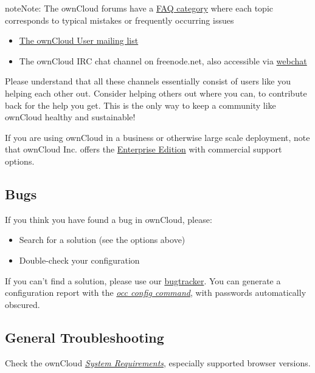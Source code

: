 \documentclass[letterpaper,10pt,english]{sphinxmanual}
\begin{document}
\begin{notice}{note}{Note:}
The ownCloud forums have a \href{https://central.owncloud.org/c/faq}{FAQ category} where each topic corresponds
to typical mistakes or frequently occurring issues
\end{notice}
\begin{itemize}
\item {} 
\href{https://mailman.owncloud.org/mailman/listinfo/user}{The ownCloud User mailing list}

\item {} 
The ownCloud IRC chat channel  on
freenode.net, also accessible via \href{http://webchat.freenode.net/?channels=owncloud}{webchat}

\end{itemize}

Please understand that all these channels essentially consist of users like you
helping each other out. Consider helping others out where you can, to contribute
back for the help you get. This is the only way to keep a community like
ownCloud healthy and sustainable!

If you are using ownCloud in a business or otherwise large scale deployment,
note that ownCloud Inc. offers the \href{https://owncloud.com/lp/community-or-enterprise/}{Enterprise Edition} with commercial
support options.


\subsection{Bugs}
\label{issues/general_troubleshooting:bugs}
If you think you have found a bug in ownCloud, please:
\begin{itemize}
\item {} 
Search for a solution (see the options above)

\item {} 
Double-check your configuration

\end{itemize}

If you can't find a solution, please use our \href{https://doc.owncloud.org/server/9.2/developer\_manual/bugtracker/index.html}{bugtracker}. You can generate a
configuration report with the {\hyperref[configuration_server/occ_command:config-commands-label]{\emph{occ config command}}}, with passwords automatically obscured.


\subsection{General Troubleshooting}
\label{issues/general_troubleshooting:id1}
Check the ownCloud {\hyperref[installation/system_requirements::doc]{\emph{System Requirements}}}, especially
supported browser versions.
\end{document}
